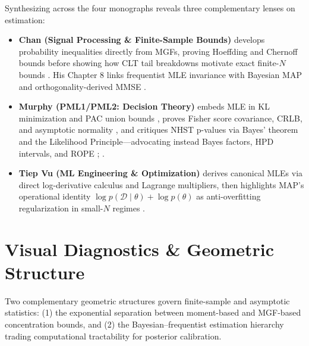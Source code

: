 \documentclass[../../../../master.tex]{subfiles}
\begin{document}
\begin{crossbook}
Synthesizing across the four monographs reveals three complementary lenses on estimation:
\begin{itemize}
  \item \textbf{Chan (Signal Processing \& Finite-Sample Bounds)} develops probability inequalities directly from MGFs, proving Hoeffding and Chernoff bounds  before showing how CLT tail breakdowns motivate exact finite-$N$ bounds . His Chapter 8 links frequentist MLE invariance with Bayesian MAP and orthogonality-derived MMSE .
  \item \textbf{Murphy (PML1/PML2: Decision Theory)} embeds MLE in KL minimization and PAC union bounds , proves Fisher score covariance, CRLB, and asymptotic normality , and critiques NHST p-values via Bayes' theorem and the Likelihood Principle---advocating instead Bayes factors, HPD intervals, and ROPE ; .
  \item \textbf{Tiep Vu (ML Engineering \& Optimization)} derives canonical MLEs via direct log-derivative calculus and Lagrange multipliers, then highlights MAP's operational identity $\log p(\mathcal{D}\mid\theta) + \log p(\theta)$ as anti-overfitting regularization in small-$N$ regimes .
\end{itemize}
\end{crossbook}

\section{Visual Diagnostics \& Geometric Structure}
\label{sec:asymp:visuals}

Two complementary geometric structures govern finite-sample and asymptotic statistics: (1) the exponential separation between moment-based and MGF-based concentration bounds, and (2) the Bayesian--frequentist estimation hierarchy trading computational tractability for posterior calibration.
\end{document}
